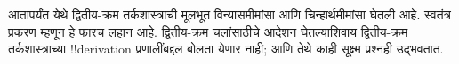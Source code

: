 \documentclass[../../../include/open-logic-chapter]{subfiles}
\begin{document}

\begin{editorial}
आतापर्यंत येथे
द्वितीय-क्रम
तर्कशास्त्राची
मूलभूत विन्यासमीमांसा
आणि चिन्हार्थमीमांसा
घेतली आहे.
स्वतंत्र प्रकरण
म्हणून हे फारच
लहान आहे.
द्वितीय-क्रम
चलांसाठीचे आदेशन
घेतल्याशिवाय
द्वितीय-क्रम
तर्कशास्त्राच्या
!!{derivation} प्रणालींबद्दल
बोलता येणार नाही;
आणि तेथे काही
सूक्ष्म प्रश्नही
उद्भवतात.
\end{editorial}







\OLEndChapterHook
\end{document}

